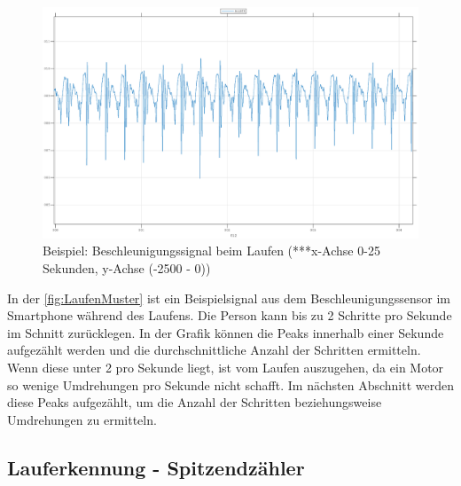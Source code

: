 
\begin{figure}[H]
	\centering
	\includegraphics[width=\linewidth]{Bilder/LaufenMuster.eps}
	\caption{Beispiel: Beschleunigungssignal beim Laufen (***x-Achse 0-25 Sekunden, y-Achse (-2500 - 0))}
	\label{fig:LaufenMuster}
\end{figure}
In der \autoref{fig:LaufenMuster} ist ein Beispielsignal aus dem Beschleunigungssensor im Smartphone während des Laufens. Die Person kann bis zu 2 Schritte pro Sekunde im Schnitt zurücklegen. In der Grafik können die Peaks innerhalb einer Sekunde aufgezählt werden und die durchschnittliche Anzahl der Schritten ermitteln. Wenn diese unter 2 pro Sekunde liegt, ist vom Laufen auszugehen, da ein Motor so wenige Umdrehungen pro Sekunde nicht schafft. Im nächsten Abschnitt werden diese Peaks aufgezählt, um die Anzahl der Schritten beziehungsweise Umdrehungen zu ermitteln.
%
\subsection{Lauferkennung - Spitzendzähler} \label{abs:PeaksAufzaehlen}

